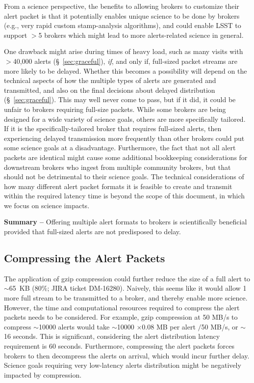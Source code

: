 \documentclass[DM,lsstdraft,authoryear,toc]{lsstdoc}
\begin{document}
From a science perspective, the benefits to allowing brokers to customize their alert packet is that it potentially enables unique science to be done by brokers (e.g., very rapid custom stamp-analysis algorithms), and could enable LSST to support $>$5 brokers which might lead to more alerts-related science in general.

One drawback might arise during times of heavy load, such as many visits with $>$40,000 alerts (\S~\ref{sec:graceful}), \emph{if}, and only if, full-sized packet streams are more likely to be delayed.
Whether this becomes a possibility will depend on the technical aspects of how the multiple types of alerts are generated and transmitted, and also on the final decisions about delayed distribution (\S~\ref{sec:graceful}).
This may well never come to pass, but if it did, it could be unfair to brokers requiring full-size packets.
While some brokers are being designed for a wide variety of science goals, others are more specifically tailored.
If it is the specifically-tailored broker that requires full-sized alerts, then experiencing delayed transmission more frequently than other brokers could put some science goals at a disadvantage. 
Furthermore, the fact that not all alert packets are identical might cause some additional bookkeeping considerations for downstream brokers who ingest from multiple community brokers, but that should not be detrimental to their science goals.
The technical considerations of how many different alert packet formats it is feasible to create and transmit within the required latency time is beyond the scope of this document, in which we focus on science impacts.

{\bf Summary --} Offering multiple alert formats to brokers is scientifically beneficial provided that full-sized alerts are not predisposed to delay.

\subsection{Compressing the Alert Packets}\label{ssec:packets_compress}

The application of gzip compression could further reduce the size of a full alert to $\sim$65~KB (80\%; JIRA ticket DM-16280).
Naively, this seems like it would allow 1 more full stream to be transmitted to a broker, and thereby enable more science.
However, the time and computational resources required to compress the alert packets needs to be considered.
For example, gzip compression at 50 MB/s to compress $\sim$10000 alerts would take $\sim$10000 $\times$0.08 MB per alert $/$50 MB/s, or $\sim$16 seconds.
This is significant, considering the alert distribution latency requirement is 60 seconds. 
Furthermore, compressing the alert packets forces brokers to then decompress the alerts on arrival, which would incur further delay.
Science goals requiring very low-latency alerts distribution might be negatively impacted by compression.
\end{document}
